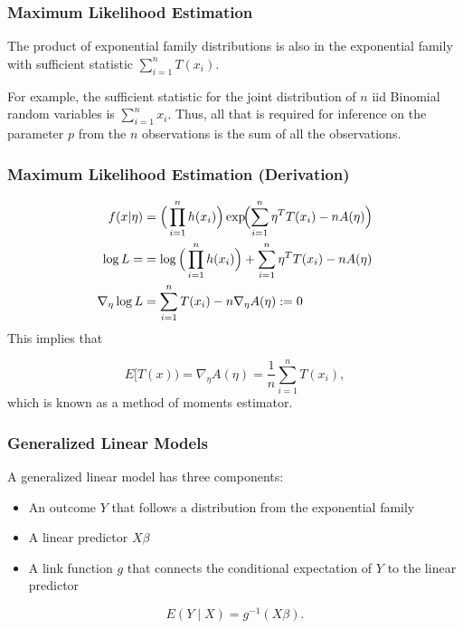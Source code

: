 \documentclass{beamer}
\begin{document}
\begin{frame}
\frametitle{Maximum Likelihood Estimation}
The product of exponential family distributions is also in the exponential family with sufficient statistic $\sum_{i=1}^n T(x_i).$

\vspace*{1em}

For example, the sufficient statistic for the joint distribution of $n$ iid Binomial random variables is $\sum_{i=1}^n x_i.$ Thus, all that is required for inference on the parameter $p$ from the $n$ observations is the sum of all the observations. 
\end{frame}

\begin{frame}
\frametitle{Maximum Likelihood Estimation (Derivation)}
\begin{align}
f(x|\eta)  &= \Big(
\prod_{i=1}^n h(x_i)
\Big) \exp\!\Bigl(\sum_{i=1}^n \eta^T T(x_i) - nA(\eta)\Bigr) \\
\log L = &=  \log \Big(
\prod_{i=1}^n h(x_i)
\Big) 
+ \sum_{i=1}^n \eta^T T(x_i) - nA(\eta)\\
\nabla_{\eta} \log L &= \sum_{i=1}^n T(x_i) - n \nabla_{\eta} A(\eta) :=0
\end{align}
This implies that 

$$E[T(x)) =  \nabla_{\eta} A(\eta) = \frac{1}{n} \sum_{i=1}^n T(x_i),$$
which is known as a method of moments estimator. 

\end{frame}

\begin{frame}
\frametitle{Generalized Linear Models}

A generalized linear model has three components:

\begin{itemize}
\item An outcome $Y$ that follows a distribution from the
exponential family
\item A linear predictor $X \beta$
\item A link function $g$ that connects the conditional expectation of $Y$ to the linear predictor
\end{itemize}
$$E(Y \mid X) = g^{-1}(X \beta).$$

\end{frame}
\end{document}
